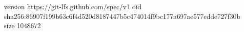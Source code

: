 version https://git-lfs.github.com/spec/v1
oid sha256:86907f199b63c6f4d520d8187447b5c474014f9bc177a697ae577edde727f30b
size 1048672
